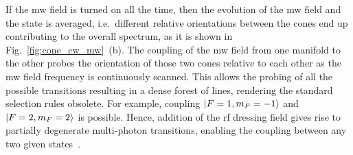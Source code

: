 \documentclass[%
reprint,
 amsmath,amssymb,
 aps,
floatfix,
]{revtex4-1}
\newcommand{\TP}[2][red]{\textcolor{#1}{\textit{TP: #2}}}
\begin{document}
If the mw field is turned on all the time, then the evolution of the mw field and the state is averaged, i.e.\ different relative orientations between the cones end up contributing to the overall spectrum, as it is shown in Fig.~\ref{fig:cone_cw_mw}~(b). 
The coupling of the mw field from one manifold to the other probes the orientation of those two cones relative to each other as the mw field frequency is continuously scanned.
This allows the probing of all the possible transitions resulting in a dense forest of lines, rendering the standard selection rules obsolete. For example, coupling $\Ket{F=1, m_F=-1}$ and $\Ket{F=2, m_F=2}$ is possible. Hence, addition of the rf dressing field gives rise to partially degenerate multi-photon transitions, enabling the coupling between any two given states~\cite{sinuco19}.





\end{document}
